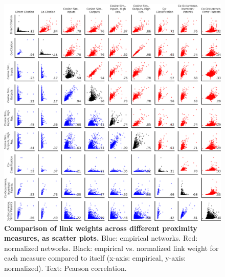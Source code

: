 \documentclass[]{svjour3}
\begin{document}
\begin{figure}[]
\centering
\includegraphics[width=\textwidth]{figs/Measure_Comparison_Scatter_Plots_IPC.png} 
\caption{\textbf{Comparison of link weights across different proximity measures, as scatter plots.} Blue: empirical networks. Red: normalized networks. Black: empirical vs. normalized link weight for each measure compared to itself (x-axis: empirical, y-axis: normalized). Text: Pearson correlation.
}\label{Measure_Comparison_Scatter_Plots}
\end{figure}
\end{document}
